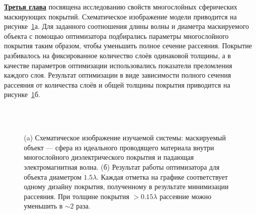 \underline{\textbf{Третья глава}} посвящена исследованию свойств
многослойных сферических маскирующих покрытий. Схематическое
изображение модели приводится на рисунке~\ref{img:scattering}а. Для
заданного соотношения длины волны и диаметра маскируемого объекта с
помощью оптимизатора подбирались параметры многослойного покрытия
таким образом, чтобы уменьшить полное сечение рассеяния.  Покрытие
разбивалось на фиксированное количество слоёв одинаковой толщины, а в
качестве параметров оптимизации использовались показатели преломления
каждого слоя.  Результат оптимизации в виде зависимости полного
сечения рассеяния от количества слоёв и общей толщины покрытия
приводится на рисунке~\ref{img:scattering}б.
\begin{figure}[t]
  \begin{minipage}[ht]{0.45\linewidth}        
  \end{minipage}
  \hfill
  \begin{minipage}[ht]{0.54\linewidth}
  \end{minipage}\\
  \vspace{0.3em}\\
  \begin{minipage}[ht]{0.45\linewidth}        
  \end{minipage}
  \hfill
  \begin{minipage}[ht]{0.54\linewidth}
  \end{minipage}
  \caption{(a) Схематическое изображение изучаемой системы: маскируемый
    объект --- сфера из идеального проводящего материала внутри
    многослойного диэлектрического покрытия и падающая
    электромагнитная волна. (б) 
    Результат работы оптимизатора для объекта диаметром $1.5\lambda$.
    Каждая отметка на графике соответствует одному дизайну покрытия,
    полученному в результате минимизации рассеяния. При толщине
    покрытия $>0.15\lambda$ рассеяние можно уменьшить в $\sim 2$
    раза.}
  \label{img:scattering}  
\end{figure}
